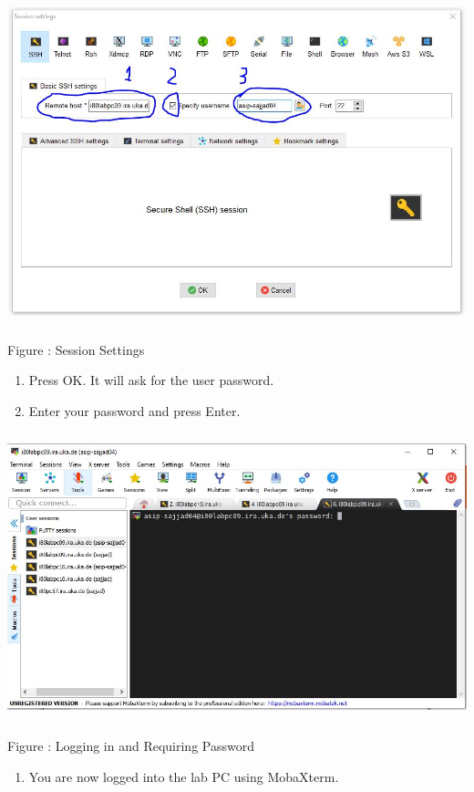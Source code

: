 \documentclass[
]{article}
\begin{document}
\includegraphics[width=5.53861in,height=3.70864in]{images/media/image2.JPG}

Figure : Session Settings

\begin{enumerate}
\def\labelenumi{\arabic{enumi}.}
\setcounter{enumi}{4}
\item
  Press OK. It will ask for the user password.
\item
  Enter your password and press Enter.
\end{enumerate}

\includegraphics[width=5.67963in,height=3.28535in]{images/media/image3.JPG}

Figure : Logging in and Requiring Password

\begin{enumerate}
\def\labelenumi{\arabic{enumi}.}
\setcounter{enumi}{6}
\item
  You are now logged into the lab PC using MobaXterm.
\end{enumerate}
\end{document}
